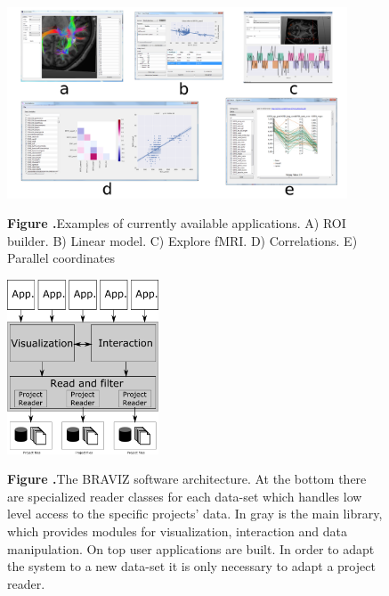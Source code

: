 \documentclass[utf8]{frontiersSCNS} %
\begin{document}
\begin{figure}[h!]
\begin{center}
\includegraphics[width=0.9\textwidth]{figures/many_apps.png}
\end{center}
 \textbf{\label{fig_other_apps} Figure .}{Examples of currently available applications. A) ROI builder. B) Linear model. C) Explore fMRI. D) Correlations. E) Parallel coordinates}
\end{figure}

\begin{figure}[h!]
\begin{center}
\includegraphics[width=0.4\textwidth]{figures/arquitecture.png}
\end{center}
 \textbf{\label{fig_arch} Figure .}{The BRAVIZ software architecture. At the bottom there are specialized reader classes for each data-set which handles low level access to the specific projects' data. In gray is the main  library, which provides modules for visualization, interaction and data manipulation. On top user applications are built. In order to adapt the system to a new data-set it is only necessary to adapt a project reader.}
\end{figure}
\end{document}
